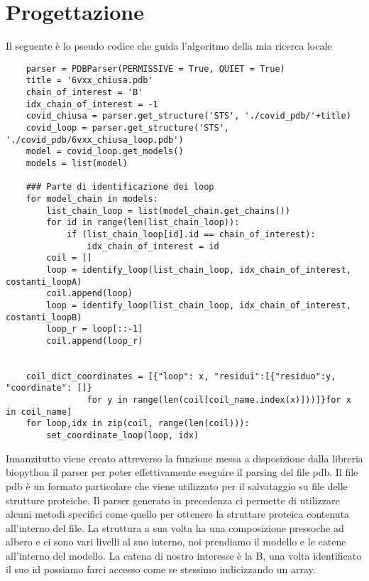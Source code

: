 \chapter{Progettazione}\label{chapter:progettazione}
Il seguente è lo pseudo codice che guida l'algoritmo della mia ricerca locale

\begin{verbatim}
    parser = PDBParser(PERMISSIVE = True, QUIET = True)
    title = '6vxx_chiusa.pdb'
    chain_of_interest = 'B'
    idx_chain_of_interest = -1
    covid_chiusa = parser.get_structure('STS', './covid_pdb/'+title)
    covid_loop = parser.get_structure('STS', './covid_pdb/6vxx_chiusa_loop.pdb')
    model = covid_loop.get_models()
    models = list(model)

    ### Parte di identificazione dei loop
    for model_chain in models:
        list_chain_loop = list(model_chain.get_chains())
        for id in range(len(list_chain_loop)):
            if (list_chain_loop[id].id == chain_of_interest):
                idx_chain_of_interest = id
        coil = []
        loop = identify_loop(list_chain_loop, idx_chain_of_interest, costanti_loopA)
        coil.append(loop)
        loop = identify_loop(list_chain_loop, idx_chain_of_interest, costanti_loopB)
        loop_r = loop[::-1]
        coil.append(loop_r)


    coil_dict_coordinates = [{"loop": x, "residui":[{"residuo":y, "coordinate": []}
                for y in range(len(coil[coil_name.index(x)]))]}for x in coil_name]
    for loop,idx in zip(coil, range(len(coil))):
        set_coordinate_loop(loop, idx)
\end{verbatim}
Innanzitutto viene creato attreverso la funzione messa a disposizione dalla libreria biopython il parser per poter effettivamente eseguire il parsing del file pdb.
Il file pdb è un formato particolare che viene utilizzato per il salvataggio su file delle strutture proteiche. Il parser generato in precedenza ci permette di
utilizzare alcuni metodi specifici come quello per ottenere la struttare proteica contenuta all'interno del file. La struttura a sua volta ha una composizione pressoche
ad albero e ci sono vari livelli al suo interno, noi prendiamo il modello e le catene all'interno del modello. La catena di nostro interesse è la B, una volta identificato
il suo id possiamo farci accesso come se stessimo indicizzando un array. 

